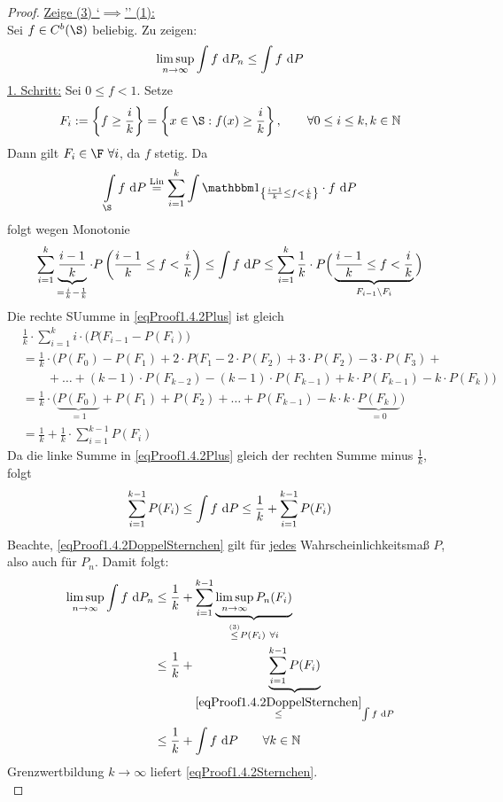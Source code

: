 \begin{proof}
\underline{Zeige (3) `$\implies$'' (1):}\\
Sei $f\in C^b(\S)$ beliebig. Zu zeigen:
\begin{align}\label{eqProof1.4.2Sternchen}
\limsup\limits_{n\to\infty}\int\limits f\text{ d} P_n\leq\int\limits f\text{ d} P
\end{align}
\underline{1. Schritt:} Sei $0\leq f<1$. Setze
\begin{align*}
F_i:=\left\lbrace f\geq\frac{i}{k}\right\rbrace=\left\lbrace x\in\S:f(x)\geq\frac{i}{k}\right\rbrace,\qquad \forall 0\leq i\leq k,k\in\N
\end{align*}
Dann gilt $F_i\in\F~\forall i$, da $f$ stetig. Da 
\begin{align*}
\int\limits_{\S}f\d P
\stackeq{\text{Lin}}
\sum\limits_{i=1}^k\int\limits\indi_{\left\lbrace\frac{i-1}{k}\leq f<\frac{i}{k}\right\rbrace}\cdot f\d P
\end{align*}
folgt wegen Monotonie
\begin{align}\label{eqProof1.4.2Plus}
\sum\limits_{i=1}^k\underbrace{\frac{i-1}{k}}_{=\frac{i}{k}-\frac{1}{k}}\cdot P\left(\frac{i-1}{k}\leq f<\frac{i}{k}\right)
\leq
\int\limits f\text{ d} P
\leq
\sum\limits_{i=1}^k \frac{1}{k}\cdot P\Big(\underbrace{\frac{i-1}{k}\leq f<\frac{i}{k}}_{F_{i-1}\setminus F_i}\Big)
\end{align}
Die rechte SUumme in \eqref{eqProof1.4.2Plus} ist gleich
\begin{align*}
&\frac{1}{k}\cdot\sum\limits_{i=1}^k i\cdot\big( P(F_{i-1}-P(F_i)\big)\\
&=\frac{1}{k}\cdot\Big(P(F_0)-P(F_1)+2\cdot P(F_1-2\cdot P(F_2)+3\cdot P(F_2)-3\cdot P(F_3)+\\
&\qquad+\ldots+(k-1)\cdot P(F_{k-2})-(k-1)\cdot P(F_{k-1})+k\cdot P(F_{k-1})-k\cdot P(F_k)\Big)\\
&=\frac{1}{k}\cdot\Big(\underbrace{P(F_0)}_{=1}+P(F_1)+P(F_2)+\ldots+P(F_{k-1})-k\cdot k\cdot \underbrace{P(F_k)}_{=0}\Big)\\
&=\frac{1}{k}+\frac{1}{k}\cdot\sum\limits_{i=1}^{k-1} P(F_i)
\end{align*}
Da die linke Summe in \eqref{eqProof1.4.2Plus} gleich der rechten Summe minus $\frac{1}{k}$, folgt
\begin{align}\label{eqProof1.4.2DoppelSternchen}
\sum\limits_{i=1}^{k-1} P(F_i)
\leq\int\limits f\text{ d} P
\leq\frac{1}{k}+\sum\limits_{i=1}^{k-1} P(F_i)
\end{align}
Beachte, \eqref{eqProof1.4.2DoppelSternchen} gilt für \ul{jedes} Wahrscheinlichkeitsmaß $P$, also auch für $P_n$. Damit folgt:
\begin{align*}
\limsup\limits_{n\to\infty}\int\limits f\text{ d} P_n
&\leq\frac{1}{k}+\sum\limits_{i=1}^{k-1}\underbrace{\limsup\limits_{n\to\infty} P_n(F_i)}_{\stackrel{(3)}{\leq}P(F_i)~\forall i}\\
&\leq\frac{1}{k}+\underbrace{\sum\limits_{i=1}^{k-1} P(F_i)}_{\stackrel{\eqref{eqProof1.4.2DoppelSternchen}}{\leq}\int\limits f\text{ d} P}\\
&\leq\frac{1}{k}+\int\limits f\text{ d} P\qquad\forall k\in\mathbb{N}
\end{align*}
Grenzwertbildung $k\to\infty$ liefert \eqref{eqProof1.4.2Sternchen}.\\


\end{proof}
